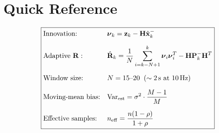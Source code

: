 \documentclass[11pt,a4paper]{article}
\begin{document}
\section*{Quick Reference}

\begin{equation*}
\boxed{
\begin{aligned}
    &\text{Innovation:} && \boldsymbol{\nu}_k = \mathbf{z}_k - \mathbf{H}\hat{\mathbf{x}}_k^{-} \\[6pt]
    &\text{Adaptive } \mathbf{R}: && \hat{\mathbf{R}}_k = \frac{1}{N}\sum_{i=k-N+1}^{k}\boldsymbol{\nu}_i\boldsymbol{\nu}_i^T - \mathbf{H}\mathbf{P}_k^{-}\mathbf{H}^T \\[6pt]
    &\text{Window size:} && N = 15\text{--}20 \;\;(\sim 2\text{\,s at 10\,Hz}) \\[6pt]
    &\text{Moving-mean bias:} && \mathrm{Var}_{\text{est}} = \sigma^2 \cdot \frac{M-1}{M} \\[6pt]
    &\text{Effective samples:} && n_{\mathrm{eff}} = \frac{n(1-\rho)}{1+\rho}
\end{aligned}
}
\end{equation*}
\end{document}

